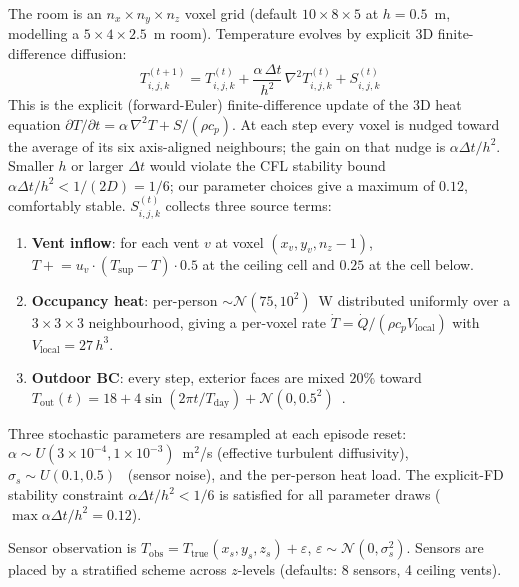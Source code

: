 \documentclass[11pt,letterpaper]{article}
\begin{document}
The room is an $n_x \times n_y \times n_z$ voxel grid (default
$10 \times 8 \times 5$ at $h = 0.5$~m, modelling a $5 \times 4 \times 2.5$~m
room). Temperature evolves by explicit 3D finite-difference diffusion:
\begin{equation}
T_{i,j,k}^{(t+1)} = T_{i,j,k}^{(t)} + \frac{\alpha \, \Delta t}{h^2}
                    \, \nabla^2 T_{i,j,k}^{(t)} + S_{i,j,k}^{(t)}
\label{eq:diffusion}
\end{equation}
This is the explicit (forward-Euler) finite-difference update of the 3D
heat equation $\partial T / \partial t = \alpha\, \nabla^2 T + S/(\rho c_p)$.
At each step every voxel is nudged toward the average of its six axis-aligned
neighbours; the gain on that nudge is $\alpha \Delta t / h^2$. Smaller $h$
or larger $\Delta t$ would violate the CFL stability bound
$\alpha \Delta t / h^2 < 1/(2D) = 1/6$; our parameter choices give a
maximum of $0.12$, comfortably stable. $S^{(t)}_{i,j,k}$ collects three
source terms:
\begin{enumerate}
\itemsep0pt
\item \textbf{Vent inflow}: for each vent $v$ at voxel $(x_v, y_v, n_z\!-\!1)$,
      $T \mathrel{+}\!= u_v \cdot (T_{\mathrm{sup}} - T) \cdot 0.5$
      at the ceiling cell and $0.25$ at the cell below.
\item \textbf{Occupancy heat}: per-person $\sim \mathcal{N}(75, 10^2)$~W
      distributed uniformly over a $3\times3\times3$ neighbourhood,
      giving a per-voxel rate $\dot{T} = \dot{Q} / (\rho c_p V_{\mathrm{local}})$
      with $V_{\mathrm{local}} = 27\,h^3$.
\item \textbf{Outdoor BC}: every step, exterior faces are mixed
      $20\%$ toward $T_{\mathrm{out}}(t) = 18 + 4\sin(2\pi t / T_{\mathrm{day}})
      + \mathcal{N}(0, 0.5^2)$~\textcelsius.
\end{enumerate}

Three stochastic parameters are resampled at each episode reset:
$\alpha \sim U(3\times 10^{-4}, 1\times 10^{-3})$~m$^2$/s (effective
turbulent diffusivity), $\sigma_s \sim U(0.1, 0.5)$~\textcelsius{} (sensor
noise), and the per-person heat load. The explicit-FD stability
constraint $\alpha \Delta t / h^2 < 1/6$ is satisfied for all parameter
draws ($\max \alpha \Delta t / h^2 = 0.12$).

Sensor observation is $T_{\mathrm{obs}} = T_{\mathrm{true}}(x_s, y_s, z_s)
+ \varepsilon$, $\varepsilon \sim \mathcal{N}(0, \sigma_s^2)$. Sensors are
placed by a stratified scheme across $z$-levels (defaults: 8 sensors,
4 ceiling vents).
\end{document}
